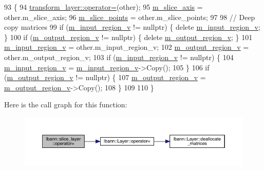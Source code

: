 \begin{DoxyCode}
93                                                    \{
94     \hyperlink{classlbann_1_1Layer_a00d8acde68fda2f38c4a39ef8c89234a}{transform\_layer::operator=}(other);
95     \hyperlink{classlbann_1_1slice__layer_a349dcd71f67d77d40247da24e4641ea2}{m\_slice\_axis} = other.m\_slice\_axis;
96     \hyperlink{classlbann_1_1slice__layer_af79dab13a70da2e81209e7ae15166e30}{m\_slice\_points} = other.m\_slice\_points;
97 
98     \textcolor{comment}{// Deep copy matrices}
99     \textcolor{keywordflow}{if} (\hyperlink{classlbann_1_1slice__layer_a3e64f86a9e999d3d72867c6009aa99ba}{m\_input\_region\_v} != \textcolor{keyword}{nullptr})  \{ \textcolor{keyword}{delete} \hyperlink{classlbann_1_1slice__layer_a3e64f86a9e999d3d72867c6009aa99ba}{m\_input\_region\_v}; \}
100     \textcolor{keywordflow}{if} (\hyperlink{classlbann_1_1slice__layer_a9d72208fc8136641e91cb208c38f8b65}{m\_output\_region\_v} != \textcolor{keyword}{nullptr}) \{ \textcolor{keyword}{delete} 
      \hyperlink{classlbann_1_1slice__layer_a9d72208fc8136641e91cb208c38f8b65}{m\_output\_region\_v}; \}
101     \hyperlink{classlbann_1_1slice__layer_a3e64f86a9e999d3d72867c6009aa99ba}{m\_input\_region\_v} = other.m\_input\_region\_v;
102     \hyperlink{classlbann_1_1slice__layer_a9d72208fc8136641e91cb208c38f8b65}{m\_output\_region\_v} = other.m\_output\_region\_v;
103     \textcolor{keywordflow}{if} (\hyperlink{classlbann_1_1slice__layer_a3e64f86a9e999d3d72867c6009aa99ba}{m\_input\_region\_v} != \textcolor{keyword}{nullptr}) \{
104       \hyperlink{classlbann_1_1slice__layer_a3e64f86a9e999d3d72867c6009aa99ba}{m\_input\_region\_v} = \hyperlink{classlbann_1_1slice__layer_a3e64f86a9e999d3d72867c6009aa99ba}{m\_input\_region\_v}->Copy();
105     \}
106     \textcolor{keywordflow}{if} (\hyperlink{classlbann_1_1slice__layer_a9d72208fc8136641e91cb208c38f8b65}{m\_output\_region\_v} != \textcolor{keyword}{nullptr}) \{
107       \hyperlink{classlbann_1_1slice__layer_a9d72208fc8136641e91cb208c38f8b65}{m\_output\_region\_v} = \hyperlink{classlbann_1_1slice__layer_a9d72208fc8136641e91cb208c38f8b65}{m\_output\_region\_v}->Copy();
108     \}
109 
110   \}
\end{DoxyCode}
Here is the call graph for this function\+:\nopagebreak
\begin{figure}[H]
\begin{center}
\leavevmode
\includegraphics[width=350pt]{classlbann_1_1slice__layer_a24fb9ce808d587210faa4e3b34dc1aff_cgraph}
\end{center}
\end{figure}
\mbox{\label{classlbann_1_1slice__layer_ac43785fc01d6cf6e49d3677adfaac297}} 
